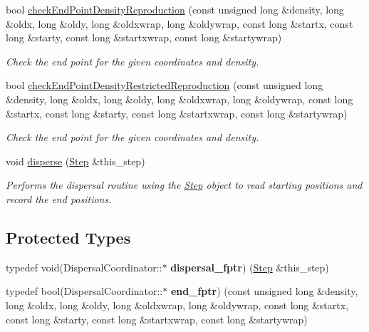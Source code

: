 \begin{DoxyCompactItemize}
bool \hyperlink{class_dispersal_coordinator_adf58975d0fd9cd45c6b9c7fe9006abcc}{check\+End\+Point\+Density\+Reproduction} (const unsigned long \&density, long \&oldx, long \&oldy, long \&oldxwrap, long \&oldywrap, const long \&startx, const long \&starty, const long \&startxwrap, const long \&startywrap)
\begin{DoxyCompactList}\small\item\em Check the end point for the given coordinates and density. \end{DoxyCompactList}\item 
bool \hyperlink{class_dispersal_coordinator_a1d1f583f94be1ea5fc0bcebc4d586e38}{check\+End\+Point\+Density\+Restricted\+Reproduction} (const unsigned long \&density, long \&oldx, long \&oldy, long \&oldxwrap, long \&oldywrap, const long \&startx, const long \&starty, const long \&startxwrap, const long \&startywrap)
\begin{DoxyCompactList}\small\item\em Check the end point for the given coordinates and density. \end{DoxyCompactList}\item 
void \hyperlink{class_dispersal_coordinator_a08e7c2e1882bd2f83ffd33eed2491fa0}{disperse} (\hyperlink{struct_step}{Step} \&this\+\_\+step)
\begin{DoxyCompactList}\small\item\em Performs the dispersal routine using the \hyperlink{struct_step}{Step} object to read starting positions and record the end positions. \end{DoxyCompactList}\end{DoxyCompactItemize}
\subsection*{Protected Types}
\begin{DoxyCompactItemize}
\item 
typedef void(Dispersal\+Coordinator\+::$\ast$ {\bfseries dispersal\+\_\+fptr}) (\hyperlink{struct_step}{Step} \&this\+\_\+step)\hypertarget{class_dispersal_coordinator_a95a865c016904f23990926af1e7534da}{}\label{class_dispersal_coordinator_a95a865c016904f23990926af1e7534da}

\item 
typedef bool(Dispersal\+Coordinator\+::$\ast$ {\bfseries end\+\_\+fptr}) (const unsigned long \&density, long \&oldx, long \&oldy, long \&oldxwrap, long \&oldywrap, const long \&startx, const long \&starty, const long \&startxwrap, const long \&startywrap)\hypertarget{class_dispersal_coordinator_a6f3d41e77253cb394c63253431decd36}{}\label{class_dispersal_coordinator_a6f3d41e77253cb394c63253431decd36}

\end{DoxyCompactItemize}
